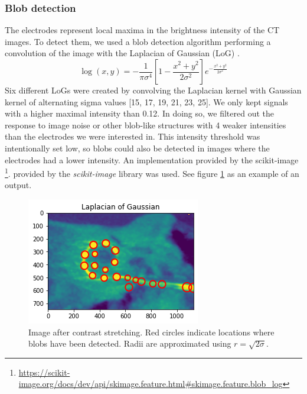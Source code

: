 \documentclass[a4paper, 10pt, twocolumn]{article}
\begin{document}
\subsubsection{Blob detection}
The electrodes represent local maxima in the brightness intensity of the CT images. To detect them, we used a blob detection algorithm performing a convolution of the image with the Laplacian of Gaussian (LoG) \cite{LoG}. 
$$
\log(x, y)=-\frac{1}{\pi \sigma^{4}}\left[1-\frac{x^{2}+y^{2}}{2 \sigma^{2}}\right] e^{-\frac{x^{2}+y^{2}}{2 \sigma^{2}}}
$$
Six different LoGs were created by convolving the Laplacian kernel with Gaussian kernel of alternating sigma values [15, 17, 19, 21, 23, 25]. We only kept signals with a higher maximal intensity than 0.12. In doing so, we filtered out the response to image noise or other blob-like structures with 4 weaker intensities than the electrodes we were interested in. This intensity threshold was intentionally set low, so blobs could also be detected in images where the electrodes had a lower intensity. An implementation  provided by the scikit-image \footnote{\url{https://scikit-image.org/docs/dev/api/skimage.feature.html#skimage.feature.blob_log}}.
provided by the \emph{scikit-image} \cite{scikit-image} library was used.
See figure \ref{blobs_detected} as an example of an output.
\begin{figure}[ht]
	\centering
  \includegraphics[width=.5\textwidth]{blobs_detected.png}
	\caption{Image after contrast stretching. Red circles indicate locations where blobs have been detected. Radii are approximated using $r=\sqrt{2 \sigma }$.}
	\label{blobs_detected}
\end{figure}
\end{document}

